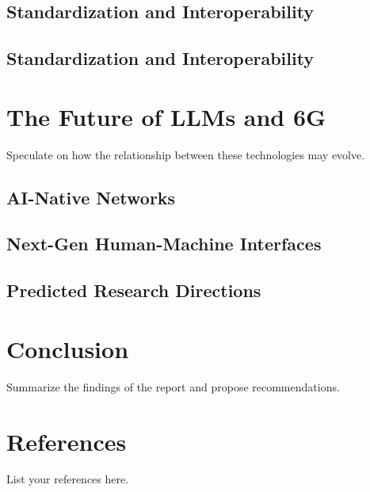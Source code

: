 \documentclass[12pt]{article}
\begin{document}
	\subsection{Standardization and Interoperability}
	\subsection{Standardization and Interoperability}
\newpage
\section{The Future of LLMs and 6G}
Speculate on how the relationship between these technologies may evolve.
	\subsection{AI-Native Networks}
	\subsection{Next-Gen Human-Machine Interfaces}
	\subsection{Predicted Research Directions}
\newpage
\section{Conclusion}
Summarize the findings of the report and propose recommendations.

\newpage
\section*{References}
List your references here.
\end{document}
